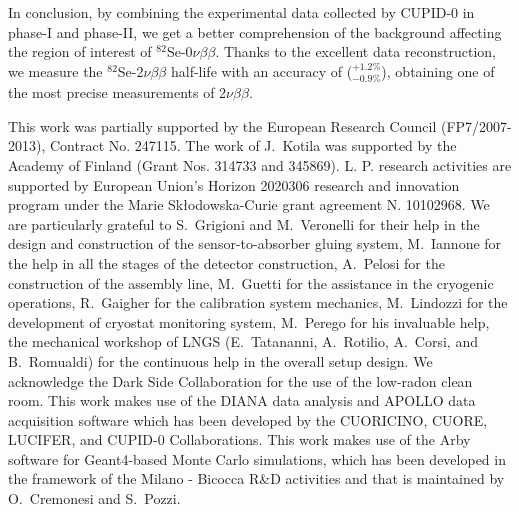\documentclass[%
reprint,
superscriptaddress,
altaffilletter,
showpacs,
showkeys,
amsmath, amssymb, aps,prl, floatfix
]{revtex4-1}
\newcommand{\se}{$^{82}$Se\xspace}
\newcommand{\onu}{$0\nu\beta \beta$\xspace}
\newcommand{\vv}{2$\nu\beta\beta$\xspace}
\newcommand{\phone}{phase-I\xspace}
\newcommand{\phtwo}{phase-II\xspace}
\begin{document}
In conclusion, by combining the experimental data collected by CUPID-0 in \phone and \phtwo, we get a better comprehension of the background affecting the region of interest of \se-\onu. Thanks to the excellent data reconstruction, we measure the \se-\vv half-life with an accuracy of ($^{+1.2\%}_{-0.9\%}$), obtaining one of the most precise measurements of \vv.

\begin{acknowledgments}
This work was partially supported by the European Research Council (FP7/2007-2013), Contract No. 247115. The work of J.~Kotila was supported by the Academy of Finland (Grant Nos. 314733 and 345869).
L. P. research activities are supported by European Union’s Horizon 2020306
research and innovation program under the Marie Skłodowska-Curie grant agreement N. 10102968. We are particularly grateful to S.~Grigioni and M.~Veronelli for their help in the design and construction of the sensor-to-absorber gluing system, M.~Iannone for the help in all the stages of the detector construction, A.~Pelosi for the construction of the assembly line, M.~Guetti for the assistance in the cryogenic operations, R.~Gaigher for the calibration system mechanics, M.~Lindozzi for the development of cryostat monitoring system, M.~Perego for his invaluable help, the mechanical workshop of LNGS (E.~Tatananni, A.~Rotilio, A.~Corsi, and B.~Romualdi) for the continuous help in the overall setup design. We acknowledge the Dark Side Collaboration for the use of the low-radon clean room. This work makes use of the DIANA data analysis and APOLLO data acquisition software which has been developed by the CUORICINO, CUORE, LUCIFER, and CUPID-0 Collaborations. This work makes use of the Arby software for Geant4-based Monte Carlo simulations, which has been developed in the framework of the Milano - Bicocca R\&D activities and that is maintained by O.~Cremonesi and S.~Pozzi.
\end{acknowledgments}

\end{document}
